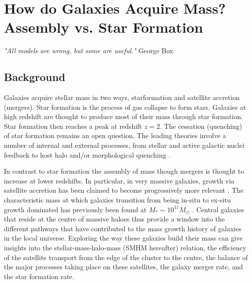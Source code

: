 

\chapter{How do Galaxies Acquire Mass? Assembly vs. Star Formation} %
\label{Chapter:GalGrowth}
\begin{center}
    \textit{"All models are wrong, but some are useful."}
    George Box
\end{center}

\section{Background}
Galaxies acquire stellar mass in two ways, starformation and satellite accretion (mergers). Star formation is the process of gas collapse to form stars. Galaxies at high redshift are thought to produce most of their mass through star formation. Star formation then reaches a peak at redshift $z=2$. The cessation (quenching) of star formation remains an open question. The leading theories involve a number of internal and external processes, from stellar and active galactic nuclei feedback to host halo and/or morphological quenching \citep{Granato2004AHosts, Dekel2009ColdFormation, Lilly2013GASHALOS, Schawinski2014TheGalaxies}. 

In contrast to star formation the assembly of mass though mergers is thought to increase at lower redshifts. In particular, in very massive galaxies, growth via satellite accretion has been claimed to become progressively more relevant \citep{DeLucia2006TheGalaxies,vanDokkum2010THE2, Shankar2013SizeUniverse, Shankar2015, Buchan2016, Groenewald2017TheGrowth, Matharu2019HST/WFC3Mergers}. The characteristic mass at which galaxies transition from being in-situ to ex-situ growth dominated has previously been found at $M_* \sim 10^{11} M_{\odot}$ \citep{Cattaneo2011HowMass, Bernardi2011EvidenceRelations, Shankar2013SizeUniverse}. Central galaxies that reside at the centre of massive haloes thus provide a window into the different pathways that have contributed to the mass growth history of galaxies in the local universe. Exploring the way these galaxies build their mass can give insights into the stellar-mass-halo-mass (SMHM hereafter) relation, the efficiency of the satellite transport from the edge of the cluster to the centre, the balance of the major processes taking place on these satellites, the galaxy merger rate, and the star formation rate.


